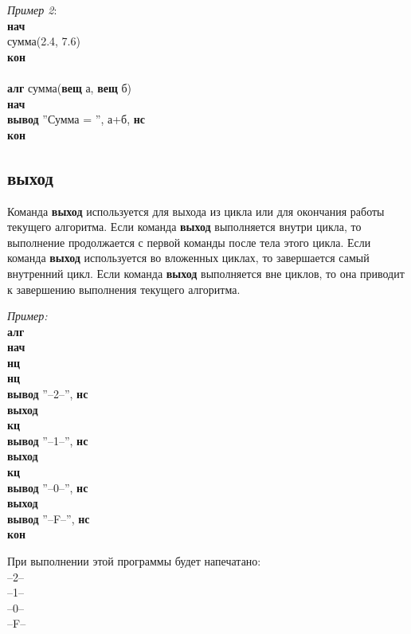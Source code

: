 \emph{Пример 2}:\\
{\sffamily
\textbf{нач}\\
\otstup сумма(2.4, 7.6)\\
\textbf{кон}\\
~\\
\textbf{алг} сумма(\textbf{вещ} а, \textbf{вещ} б)\\
\textbf{нач}\\
\otstup \textbf{вывод} ''Сумма = '', а+б, \textbf{нс}\\
\textbf{кон}
}

\subsection{выход}
\label{exit}

Команда \textbf{выход} используется для выхода из цикла или для окончания работы текущего алгоритма. Если команда \textbf{выход} выполняется внутри цикла, то выполнение продолжается с первой команды после тела этого цикла. Если команда \textbf{выход} используется во вложенных циклах, то завершается самый внутренний цикл. Если команда \textbf{выход} выполняется вне циклов, то она приводит к завершению выполнения текущего алгоритма.

\emph{Пример:}\\
{\sffamily
\textbf{алг}\\
\textbf{нач}\\
\otstup \textbf{нц}\\
\otstup \otstup \textbf{нц}\\
\otstup \otstup \otstup \textbf{вывод} ''--2--'', \textbf{нс}\\
\otstup \otstup \otstup \textbf{выход}\\
\otstup \otstup \textbf{кц}\\
\otstup \otstup \textbf{вывод} ''--1--'', \textbf{нс}\\
\otstup \otstup \textbf{выход}\\
\otstup \textbf{кц}\\
\otstup \textbf{вывод} ''--0--'', \textbf{нс}\\
\otstup \textbf{выход}\\
\otstup \textbf{вывод} ''--F--'', \textbf{нс}\\
\textbf{кон}
}

При выполнении этой программы будет напечатано:\\
{\sffamily
--2--\\
--1--\\
--0--\\
--F--
}

